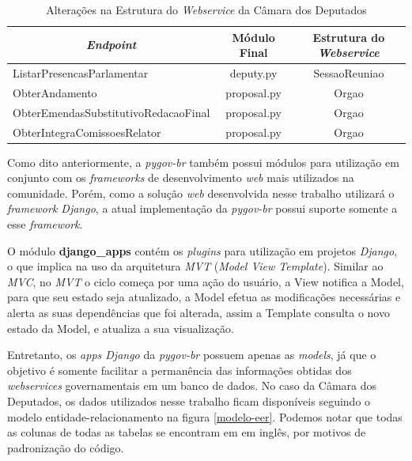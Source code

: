 \begin{table}[h]
\centering
\begin{tabular}{|l|c|c|}
\hline
\multicolumn{1}{|c|}{\textit{\textbf{Endpoint}}} & \multicolumn{1}{c|}{\textbf{Módulo Final}} & \multicolumn{1}{c|}{\textbf{Estrutura do \textit{Webservice}}} \\ \hline
ListarPresencasParlamentar & deputy.py & SessaoReuniao \\ \hline
ObterAndamento & proposal.py & Orgao \\ \hline
ObterEmendasSubstitutivoRedacaoFinal & proposal.py & Orgao \\ \hline
ObterIntegraComissoesRelator & proposal.py & Orgao \\ \hline
\end{tabular}
\caption{Alterações na Estrutura do \textit{Webservice} da Câmara dos Deputados}
\label{alteracoes-estrutura-webservice}
\end{table}

Como dito anteriormente, a \textit{pygov-br} também possui módulos para utilização em conjunto com os \textit{frameworks} de desenvolvimento \textit{web} mais utilizados na comunidade. Porém, como a solução \textit{web} desenvolvida nesse trabalho utilizará o \textit{framework Django}, a atual implementação da \textit{pygov-br} possui suporte somente a esse \textit{framework}.

O módulo \textbf{django\_apps} contém os \textit{plugins} para utilização em projetos \textit{Django}, o que implica na uso da arquitetura \textit{MVT} (\textit{Model View Template}). Similar ao \textit{MVC}, no \textit{MVT} o ciclo começa por uma ação do usuário, a View notifica a Model, para que seu estado seja atualizado, a Model efetua as modificações necessárias e alerta as suas dependências que foi alterada, assim a Template consulta o novo estado da Model, e atualiza a sua visualização.

Entretanto, os \textit{apps Django} da \textit{pygov-br} possuem apenas as \textit{models}, já que o objetivo é somente facilitar a permanência das informações obtidas dos \textit{webservices} governamentais em um banco de dados. No caso da Câmara dos Deputados, os dados utilizados nesse trabalho ficam disponíveis seguindo o modelo entidade-relacionamento na figura \ref{modelo-eer}. Podemos notar que todas as colunas de todas as tabelas se encontram em em inglês, por motivos de padronização do código.


